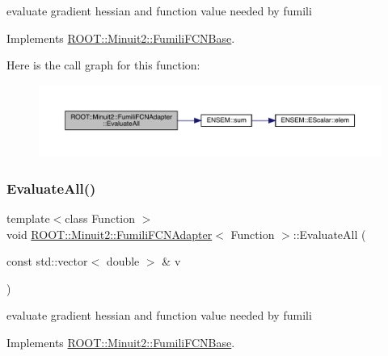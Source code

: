 evaluate gradient hessian and function value needed by fumili 

Implements \mbox{\hyperlink{classROOT_1_1Minuit2_1_1FumiliFCNBase_a0741bb4a7405cc33ab60583472a189cb}{R\+O\+O\+T\+::\+Minuit2\+::\+Fumili\+F\+C\+N\+Base}}.

Here is the call graph for this function\+:\nopagebreak
\begin{figure}[H]
\begin{center}
\leavevmode
\includegraphics[width=350pt]{de/df6/classROOT_1_1Minuit2_1_1FumiliFCNAdapter_a75bacae09c510900a45ea753afae971a_cgraph}
\end{center}
\end{figure}
\mbox{\label{classROOT_1_1Minuit2_1_1FumiliFCNAdapter_a75bacae09c510900a45ea753afae971a}} 
\subsubsection{\texorpdfstring{EvaluateAll()}{EvaluateAll()}\hspace{0.1cm}{\footnotesize\ttfamily [2/2]}}
{\footnotesize\ttfamily template$<$class Function $>$ \\
void \mbox{\hyperlink{classROOT_1_1Minuit2_1_1FumiliFCNAdapter}{R\+O\+O\+T\+::\+Minuit2\+::\+Fumili\+F\+C\+N\+Adapter}}$<$ Function $>$\+::Evaluate\+All (\begin{DoxyParamCaption}\item[{const std\+::vector$<$ double $>$ \&}]{v }\end{DoxyParamCaption})\hspace{0.3cm}{\ttfamily [virtual]}}

evaluate gradient hessian and function value needed by fumili 

Implements \mbox{\hyperlink{classROOT_1_1Minuit2_1_1FumiliFCNBase_a0741bb4a7405cc33ab60583472a189cb}{R\+O\+O\+T\+::\+Minuit2\+::\+Fumili\+F\+C\+N\+Base}}.

